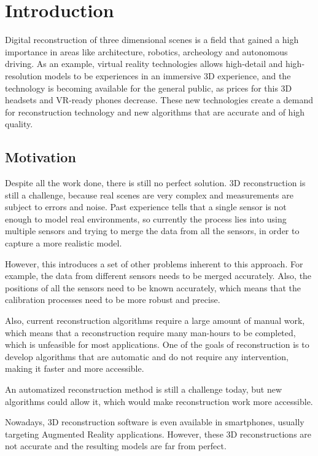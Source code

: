 \chapter{Introduction}

Digital reconstruction of three dimensional scenes is a field that gained a high importance in areas like architecture, robotics, archeology and autonomous driving. As an example, virtual reality technologies allows high-detail and high-resolution models to be experiences in an immersive 3D experience, and the technology is becoming available for the general public, as prices for this 3D headsets and VR-ready phones decrease. These new technologies create a demand for reconstruction technology and new algorithms that are accurate and of high quality.

\section{Motivation}

Despite all the work done, there is still no perfect solution. 3D reconstruction is still a challenge, because real scenes are very complex and measurements are subject to errors and noise. Past experience tells that a single sensor is not enough to model real environments, so currently the process lies into using multiple sensors and trying to merge the data from all the sensors, in order to capture a more realistic model.

However, this introduces a set of other problems inherent to this approach. For example, the data from different sensors needs to be merged accurately. Also, the positions of all the sensors need to be known accurately, which means that the calibration processes need to be more robust and precise.

Also, current reconstruction algorithms require a large amount of manual work, which means that a reconstruction require many man-hours to be completed, which is unfeasible for most applications. One of the goals of reconstruction is to develop algorithms that are automatic and do not require any intervention, making it faster and more accessible. 

An automatized reconstruction method is still a challenge today, but new algorithms could allow it, which would make reconstruction work more accessible.

Nowadays, 3D reconstruction software is even available in smartphones, usually targeting Augmented Reality applications. However, these 3D reconstructions are not accurate and the resulting models are far from perfect.

